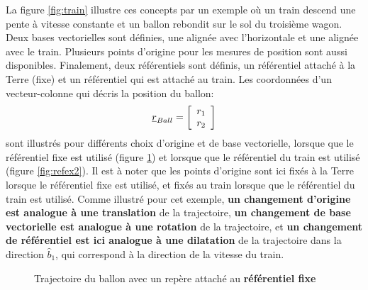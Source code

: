 La figure \ref{fig:train} illustre ces concepts par un exemple où un train descend une pente à vitesse constante et un ballon rebondit sur le sol du troisième wagon. Deux bases vectorielles sont définies, une alignée avec l'horizontale et une alignée avec le train. Plusieurs points d'origine pour les mesures de position sont aussi disponibles. Finalement, deux référentiels sont définis, un référentiel attaché à la Terre (fixe) et un référentiel qui est attaché au train. Les coordonnées d'un vecteur-colonne qui décris la position du ballon:
\begin{equation}
\underline{r}_{Ball} = \left[ \begin{array}{c} r_1 \\ r_2 \end{array} \right]
\end{equation}
sont illustrés pour différents choix d'origine et de base vectorielle, lorsque que le référentiel fixe est utilisé (figure \ref{fig:refex1}) et lorsque que le référentiel du train est utilisé (figure \ref{fig:refex2}). Il est à noter que les points d'origine sont ici fixés à la Terre lorsque le référentiel fixe est utilisé, et fixés au train lorsque que le référentiel du train est utilisé. Comme illustré pour cet exemple, \textbf{un changement d'origine est analogue à une translation} de la trajectoire, \textbf{un changement de base vectorielle est analogue à une rotation} de la trajectoire, et \textbf{un changement de référentiel est ici analogue à une dilatation} de la trajectoire dans la direction $\hat{b}_1$, qui correspond à la direction de la vitesse du train. 

\begin{figure}[H]
        \centering
         \hspace{20pt}
				 \hspace{190pt}
				 \hspace{20pt}
        \caption{Trajectoire du ballon avec un repère attaché au \textbf{référentiel fixe}}
				\label{fig:refex1}
\end{figure}

